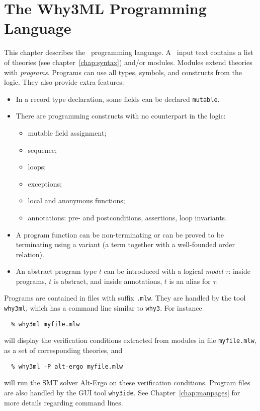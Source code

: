 \chapter{The Why3ML Programming Language}
\label{chap:whyml}

This chapter describes the \whyml\ programming language.
A \whyml\ input text contains a list of theories (see
chapter~\ref{chap:syntax}) and/or modules.
Modules extend theories with \emph{programs}.
Programs can use all types, symbols, and constructs from the logic.
They also provide extra features:
\begin{itemize}
\item
  In a record type declaration, some fields can be declared
  \texttt{mutable}.
\item
  There are programming constructs with no counterpart in the logic:
  \begin{itemize}
  \item mutable field assignment;
  \item sequence;
  \item loops;
  \item exceptions;
  \item local and anonymous functions;
  \item annotations: pre- and postconditions, assertions, loop invariants.
  \end{itemize}
\item
  A program function can be non-terminating or can be proved
  to be terminating using a variant (a term together with a well-founded
  order relation).
\item
  An abstract program type $t$ can be introduced with a logical
  \emph{model} $\tau$: inside programs, $t$ is abstract, and inside
  annotations, $t$ is an alias for $\tau$.
\end{itemize}
%
Programs are contained in files with suffix \verb|.mlw|.
They are handled by the tool \texttt{why3ml}, which has a command line
similar to \texttt{why3}. For instance
\begin{verbatim}
  % why3ml myfile.mlw
\end{verbatim}
will display the verification conditions extracted from modules in
file \texttt{myfile.mlw}, as a set of corresponding theories, and
\begin{verbatim}
  % why3ml -P alt-ergo myfile.mlw
\end{verbatim}
will run the SMT solver Alt-Ergo on these verification conditions.
Program files are also handled by the GUI tool \texttt{why3ide}.
See Chapter~\ref{chap:manpages} for more details regarding command lines.

